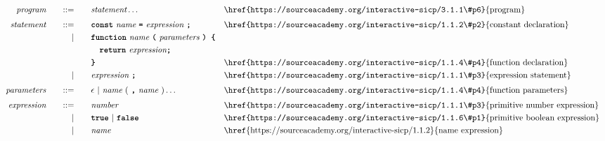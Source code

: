 \begin{alignat*}{9}
&& \textit{program}    &&\quad ::= &\quad && \textit{statement} \ldots
                                                           && \textrm{\href{https://sourceacademy.org/interactive-sicp/3.1.1\#p6}{program}} \\[1mm]
&& \textit{statement}    &&\quad ::= &\quad && \textbf{\texttt{const}}\  \textit{name} \ 
                                           \textbf{\texttt{=}}\  \textit{expression} \ \textbf{\texttt{;}}
                                                           && \textrm{\href{https://sourceacademy.org/interactive-sicp/1.1.2\#p2}{constant declaration}} \\
&&                       && |   &\quad && \textbf{\texttt{function}}\  \textit{name} \ 
                                          \textbf{\texttt{(}}\  \textit{parameters} \ \textbf{\texttt{) \{}}\\
 &&                       &&     &      && \ \ \  \textbf{\texttt{return}}\ \textit{expression}\textbf{\texttt{;}} \\
&&                       &&     &      && \textbf{\texttt{\}}} && \textrm{\href{https://sourceacademy.org/interactive-sicp/1.1.4\#p4}{function declaration}}\\
&&                       && |   &\quad &&  \textit{expression} \ \textbf{\texttt{;}}
                                                           && \textrm{\href{https://sourceacademy.org/interactive-sicp/1.1.1\#p3}{expression statement}} \\[1mm]
&& \textit{parameters}   && ::= &\quad &&  \epsilon\ | \  \textit{name} \ 
                                                   (\ \textbf{\texttt{,}} \ \textit{name}\ ) \ldots
                                                            && \textrm{\href{https://sourceacademy.org/interactive-sicp/1.1.4\#p4}{function parameters}}   \\[1mm]
&& \textit{expression}   && ::= &\quad &&  \textit{number}   && \textrm{\href{https://sourceacademy.org/interactive-sicp/1.1.1\#p3}{primitive number expression}}\\
&&                       && |   &\quad && \textbf{\texttt{true}}\ |\ \textbf{\texttt{false}}
                                                           && \textrm{\href{https://sourceacademy.org/interactive-sicp/1.1.6\#p1}{primitive boolean expression}}\\
&&                       && |   &\quad &&  \textit{name}   && \textrm{\href{https://sourceacademy.org/interactive-sicp/1.1.2}{name expression}}\\

\end{alignat*}
